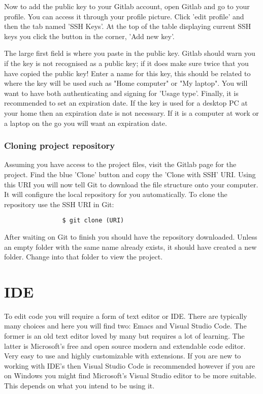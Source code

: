 \documentclass{liu_mall_engelska}
\begin{document}
            Now to add the public key to your Gitlab account, open Gitlab and go to your profile. You can access it through your profile picture. Click 'edit profile' and then the tab named 'SSH Keys'. At the top of the table displaying current SSH keys you click the button in the corner, 'Add new key'.

            The large first field is where you paste in the public key. Gitlab should warn you if the key is not recognised as a public key; if it does make sure twice that you have copied the public key! Enter a name for this key, this should be related to where the key will be used such as "Home computer" or "My laptop". You will want to have both authenticating and signing for 'Usage type'. Finally, it is recommended to set an expiration date. If the key is used for a desktop PC at your home then an expiration date is not necessary. If it is a computer at work or a laptop on the go you will want an expiration date.

        \subsubsection{Cloning project repository}
            Assuming you have access to the project files, visit the Gitlab page for the project. Find the blue 'Clone' button and copy the 'Clone with SSH' URI. Using this URI you will now tell Git to download the file structure onto your computer. It will configure the local repository for you automatically. To clone the repository use the SSH URI in Git:
            \begin{lstlisting}
                $ git clone (URI)
            \end{lstlisting}

            After waiting on Git to finish you should have the repository downloaded. Unless an empty folder with the same name already exists, it should have created a new folder. Change into that folder to view the project.

\section{IDE}
    To edit code you will require a form of text editor or IDE. There are typically many choices and here you will find two: Emacs and Visual Studio Code. The former is an old text editor loved by many but requires a lot of learning. The latter is Microsoft's free and open source modern and extendable code editor. Very easy to use and highly customizable with extensions. If you are new to working with IDE's then Visual Studio Code is recommended however if you are on Windows you might find Microsoft's Visual Studio editor to be more suitable. This depends on what you intend to be using it.
    
\end{document}
